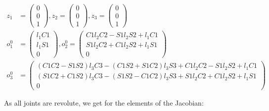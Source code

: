 \begin{align*}
z_1 &= 
\begin{pmatrix}
0 \\ 0 \\ 1
\end{pmatrix},
z_2 = 
\begin{pmatrix}
0 \\ 0 \\ 1
\end{pmatrix},
z_3 = 
\begin{pmatrix}
0 \\ 0 \\ 1
\end{pmatrix}\\
o_1^0 &= 
\begin{pmatrix}
l_1C1 \\ l_1S1 \\ 0
\end{pmatrix},
o_2^0 = 
\begin{pmatrix}
C1l_2C2-S1l_2S2+l_1C1 \\ S1l_2C2+C1l_2S2+l_1S1 \\ 0
\end{pmatrix}\\
o_3^0 &= 
\begin{pmatrix}
(C1C2-S1S2)l_3 C3-(C1S2+S1C2)l_3 S3+C1l_2C2-S1l_2S2+l_1C1 \\ (S1C2+C1S2)l_3 C3-(S1S2-C1C2)l_3 S3+S1l_2C2+C1l_2S2+l_1S1 \\ 0
\end{pmatrix}
\end{align*}

As all joints are revolute, we get for the elements of the Jacobian:


